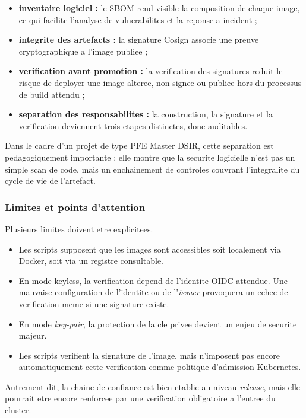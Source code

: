 \begin{itemize}
  \item \textbf{inventaire logiciel :} le SBOM rend visible la composition de chaque image, ce qui facilite l'analyse de vulnerabilites et la reponse a incident ;
  \item \textbf{integrite des artefacts :} la signature Cosign associe une preuve cryptographique a l'image publiee ;
  \item \textbf{verification avant promotion :} la verification des signatures reduit le risque de deployer une image alteree, non signee ou publiee hors du processus de build attendu ;
  \item \textbf{separation des responsabilites :} la construction, la signature et la verification deviennent trois etapes distinctes, donc auditables.
\end{itemize}

Dans le cadre d'un projet de type PFE Master DSIR, cette separation est pedagogiquement importante : elle montre que la securite logicielle n'est pas un simple scan de code, mais un enchainement de controles couvrant l'integralite du cycle de vie de l'artefact.

\subsubsection{Limites et points d'attention}

Plusieurs limites doivent etre explicitees.

\begin{itemize}
  \item Les scripts supposent que les images sont accessibles soit localement via Docker, soit via un registre consultable.
  \item En mode keyless, la verification depend de l'identite OIDC attendue. Une mauvaise configuration de l'identite ou de l'\textit{issuer} provoquera un echec de verification meme si une signature existe.
  \item En mode \textit{key-pair}, la protection de la cle privee devient un enjeu de securite majeur.
  \item Les scripts verifient la signature de l'image, mais n'imposent pas encore automatiquement cette verification comme politique d'admission Kubernetes.
\end{itemize}

Autrement dit, la chaine de confiance est bien etablie au niveau \textit{release}, mais elle pourrait etre encore renforcee par une verification obligatoire a l'entree du cluster.

